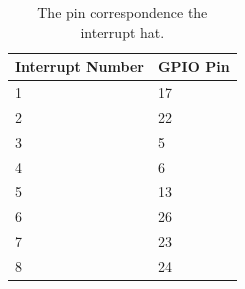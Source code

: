 \begin{table}[]                                                                                                     
\begin{tabular}{ll}                                                                                                 
\hline                                                                                                              
Interrupt Number & GPIO Pin   \\ \hline                                                                                        
1   & 17 \\                                                                                               
2   & 22 \\                                                                                               
3   & 5  \\                                                                                               
4   & 6  \\                                                                                               
5   & 13 \\                                                                                               
6   & 26 \\                                                                                               
7   & 23 \\                                                                                               
8   & 24 \\ \hline                                                                                        
\end{tabular}                                                                                                       
        \caption[Interrupt Hat GPIO Pins]{The pin correspondence the interrupt hat.}                         
        \label{opa4:tab:interrupt_pinout}                                                                                        
\end{table}     



